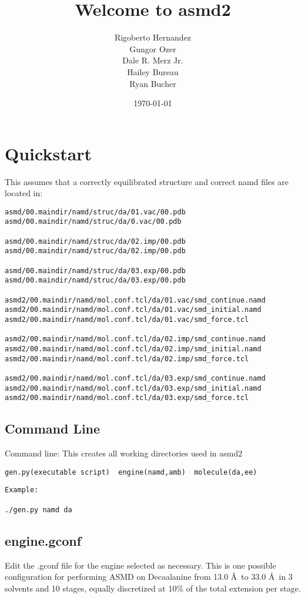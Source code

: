 \documentclass[11pt]{article}
\title{\textbf{Welcome to asmd2}}
\author{Rigoberto Hernandez\\
		Gungor Ozer\\
		Dale R. Merz Jr. \\
		Hailey Bureau \\
                Ryan Bucher}
\date{\today}
\begin{document}
\maketitle
\section{Quickstart}
This assumes that a correctly equilibrated structure and correct namd files are located in: 

\begin{verbatim}
asmd/00.maindir/namd/struc/da/01.vac/00.pdb
asmd/00.maindir/namd/struc/da/0.vac/00.pdb

asmd/00.maindir/namd/struc/da/02.imp/00.pdb
asmd/00.maindir/namd/struc/da/02.imp/00.pdb

asmd/00.maindir/namd/struc/da/03.exp/00.pdb
asmd/00.maindir/namd/struc/da/03.exp/00.pdb

asmd2/00.maindir/namd/mol.conf.tcl/da/01.vac/smd_continue.namd
asmd2/00.maindir/namd/mol.conf.tcl/da/01.vac/smd_initial.namd
asmd2/00.maindir/namd/mol.conf.tcl/da/01.vac/smd_force.tcl

asmd2/00.maindir/namd/mol.conf.tcl/da/02.imp/smd_continue.namd
asmd2/00.maindir/namd/mol.conf.tcl/da/02.imp/smd_initial.namd
asmd2/00.maindir/namd/mol.conf.tcl/da/02.imp/smd_force.tcl

asmd2/00.maindir/namd/mol.conf.tcl/da/03.exp/smd_continue.namd
asmd2/00.maindir/namd/mol.conf.tcl/da/03.exp/smd_initial.namd
asmd2/00.maindir/namd/mol.conf.tcl/da/03.exp/smd_force.tcl
\end{verbatim}

\subsection{Command Line}
Command line: 
This creates all working directories used in asmd2
\begin{verbatim}
gen.py(executable script)  engine(namd,amb)  molecule(da,ee)
\end{verbatim}
\begin{verbatim}
Example:

./gen.py namd da
\end{verbatim}

\subsection{engine.gconf}

Edit the .gconf file for the engine selected as necessary. This is one possible configuration for performing ASMD on Decaalanine from 13.0 \AA\  to 33.0 \AA\  in 3 solvents and 10 stages, equally discretized at 10\% of the total extension per stage. 
\end{document}
